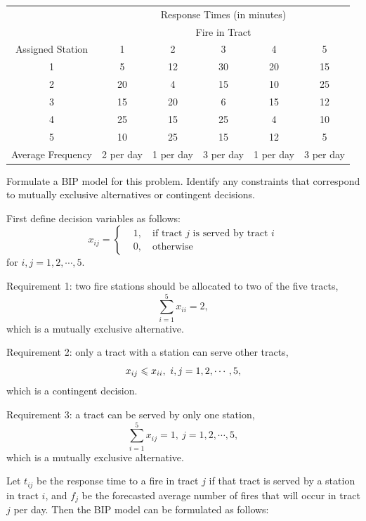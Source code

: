 \documentclass[a4paper]{article}
\begin{document}
\begin{enumerate}
\begin{table}[h]
	\centering
	\begin{tabular}{cccccc}
		\toprule[1.5pt]
		&\multicolumn{5}{c}{Response Times (in minutes)}\\
		&\multicolumn{5}{c}{Fire in Tract}\\
		\cmidrule{2-6}
		Assigned Station&1&2&3&4&5\\
		\midrule
		1&5&12& 30&20&15\\
		2&20&4& 15&10&25\\
		3&15&20& 6&15&12\\
		4&25&15& 25&4&10\\
		5&10&25& 15&12&5\\
		\midrule
		Average Frequency&2 per day&1 per day&3 per day&1 per day&3 per day\\
		\bottomrule[1.5pt]
	\end{tabular}
\end{table}

Formulate a BIP model for this problem. Identify any constraints that correspond to mutually exclusive alternatives or contingent decisions.

\begin{solution}
	
	First define decision variables as follows:
	\begin{equation*}
	x_{ij}=\left\{\begin{aligned}
	&1,\quad \text{if tract } j \text{ is served by tract } i\\
	&0,\quad \text{otherwise}
	\end{aligned}\right.
	\end{equation*}
	for $i,j=1,2,\cdots,5.$
	
	Requirement 1: two fire stations should be allocated to two of the five tracts,
	$$ \sum_{i=1}^{5} x_{ii}=2, $$
	which is a mutually exclusive alternative.
	
	Requirement 2: only a tract with a station can serve other tracts,
	$$x_{ij}\ls x_{ii}, \ i,j=1,2,\cdots,5,$$
	which is a contingent decision.
	
	Requirement 3: a tract can be served by only one station,
	$$\sum_{i=1}^{5}x_{ij}=1,\ j=1,2,\cdots,5,$$
	which is a mutually exclusive alternative.
	
	\hspace*{4ex}Let $t_{ij}$ be the response time to a fire in tract $j$ if that tract is served by a station in tract $i$, and $f_j$ be the forecasted average number of fires that will occur in tract $j$ per day. Then the BIP model can be formulated as follows:
	

\end{solution}
\end{enumerate}
\end{document}
